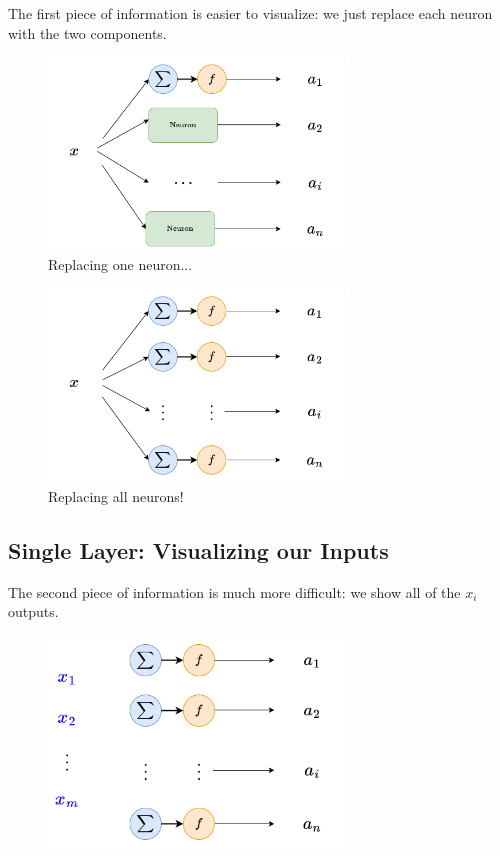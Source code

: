         The first piece of information is easier to visualize: we just replace each neuron with the two components.
        
        \begin{figure}[H]
            \centering
            \includegraphics[width=80mm,scale=0.4]{images/nn_images/replace_one_neuron.png}
            \caption*{Replacing one neuron...}
        \end{figure}
        
        \begin{figure}[H]
            \centering
            \includegraphics[width=80mm,scale=0.4]{images/nn_images/replace_all_neurons.png}
            \caption*{Replacing all neurons!}
        \end{figure}
    
    \subsection{Single Layer: Visualizing our Inputs}
    
        The second piece of information is much more difficult: we show all of the $x_i$ outputs.
        
        \begin{figure}[H]
            \centering
            \includegraphics[width=80mm,scale=0.4]{images/nn_images/layers_with_input.png}
        \end{figure}
        
